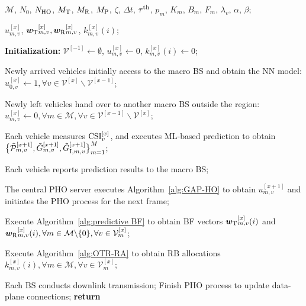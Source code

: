 \documentclass[conference, a4paper]{IEEEtran}
\theoremstyle{remark}
\begin{document}
\iffalse
    \begin{algorithm}[htbp]
        \caption{ML-Based Energy-Efficient Proactive Coordination of Handover, Beamforming and Resource Allocation (MEET-COBRA)}
        \label{alg:MEET-COBRA}
        \renewcommand{\algorithmicrequire}{\textbf{Input:}}
        \renewcommand{\algorithmicensure}{\textbf{Output:}}
        \begin{algorithmic}[1] %
            \REQUIRE  %
            $\mathcal{M}$, $N_0$, $N_{\textup{HO}}$, $M_{\rm T}$, $M_{\rm R}$, $M_{\rm P}$, $\zeta$, $\Delta t$, $\tau^{{\rm th}}$, $p_m$, $K_m$, $B_m$, $F_m$, $\lambda_v$, $\alpha$, $\beta$;
            
            \ENSURE %
            $u_{m,v}^{[x]}$,
            ${\bm{w}_{\rm T}}_{m,v}^{[x]},{\bm{w}_{\rm R}}_{m,v}^{[x]}$,
            $k_{m,v}^{[x]}(i)$;
    
            \STATE \textbf{Initialization:}  $\mathcal{V}^{[-1]} \leftarrow \emptyset$, $u_{m,v}^{[x]} \leftarrow 0$, $k_{m,v}^{[x]}(i) \leftarrow 0$;
            
                \STATE Newly arrived vehicles initially access to the macro BS and obtain the NN model: $u_{0,v}^{[x]} \leftarrow 1, \forall v \in \mathcal{V}^{[x]} \backslash \mathcal{V}^{[x-1]}$;
                
                \STATE Newly left vehicles hand over to another macro BS outside the region: $u_{m,v}^{[x]} \leftarrow 0, \forall m \in \mathcal{M}, \forall v \in \mathcal{V}^{[x-1]} \backslash \mathcal{V}^{[x]}$;
                
                \STATE Each vehicle measures ${\rm CSI}_v^{[x]}$, and executes ML-based prediction to obtain $\bigl\{\Tilde{\mathcal{P}}_{m,v}^{[x+1]}, \Tilde{G}_{m,v}^{[x+1]}, \Tilde{G}_{{\rm I},m,v}^{[x+1]}\bigr\}_{m=1}^M$;
    
                \STATE Each vehicle reports prediction results to the macro BS;
                
                \STATE The central PHO server executes Algorithm~\ref{alg:GAP-HO} to obtain $u_{m,v}^{[x+1]}$ and initiates the PHO process for the next frame;
                
                    
                    \STATE Execute Algorithm~\ref{alg:predictive BF} to obtain BF vectors ${\bm{w}_{\rm T}}_{m,v}^{[x]}(i)$ and ${\bm{w}_{\rm R}}_{m,v}^{[x]}(i), \forall m \in \mathcal{M}\backslash\{0\}, \forall v\in \mathcal{V}^{[x]}_m$;
    
                    \STATE Execute Algorithm~\ref{alg:OTR-RA} to obtain RB allocations $k_{m,v}^{[x]}(i), \forall m \in \mathcal{M}, \forall v\in \mathcal{V}^{[x]}_m$;
                                
                    \STATE Each BS conducts downlink transmission;
                \ENDFOR
                \STATE Finish PHO process to update data-plane connections;
            \ENDFOR
            \STATE \textbf{return} 
        \end{algorithmic}
    \end{algorithm}
\end{document}
